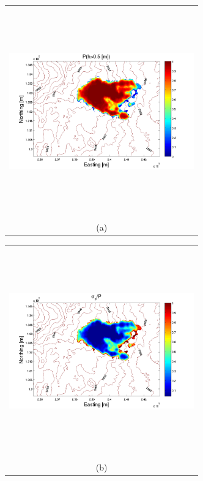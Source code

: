 \documentclass[12pt]{article}
\newcommand{\Pic}[2][0.85]{\begin{center}\texttt{[image: \#2]}
 \end{center} }
\begin{document}
\begin{figure}[H]
    \begin{minipage}[b]{0.6\textwidth}
        \begin{tabular}{c}
       \includegraphics[width=8cm,height=9cm,keepaspectratio]{figs_pdf/Galeras_0_P.pdf}\\
        (a)
        \end{tabular}
    \end{minipage}
    \begin{minipage}{0.6\textwidth}
        \begin{tabular}{c}
	\includegraphics[width=8cm,height=9cm,keepaspectratio]{figs_pdf/Galeras_0_sigma.pdf}\\
        (b)

\end{tabular}
\end{minipage}
\end{figure}
\end{document}
